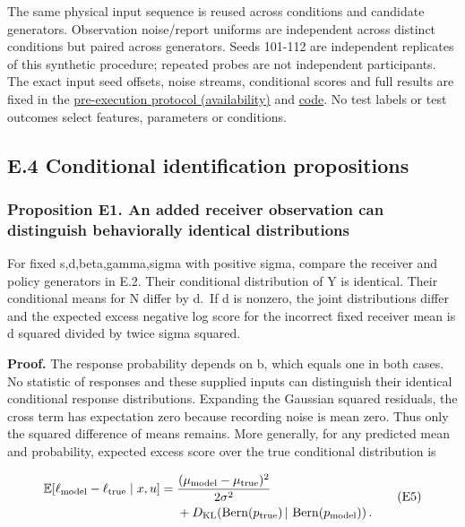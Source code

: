 \documentclass[
  american,
  11pt,
  letterpaper,
]{article}
\begin{document}
The same physical input sequence is reused across conditions and candidate generators. Observation noise/report uniforms are independent across distinct conditions but paired across generators. Seeds 101-112 are independent replicates of this synthetic procedure; repeated probes are not independent participants. The exact input seed offsets, noise streams, conditional scores and full results are fixed in the \href{https://github.com/v5ma/v5ma.github.io/blob/master/papers/companions/learning-to-feel-v1.0/ARTIFACT-AVAILABILITY.md\#artifact-9}{pre-execution protocol (availability)} and \href{https://github.com/v5ma/v5ma.github.io/blob/master/papers/companions/learning-to-feel-v1.0/analysis/joint-receiver-comparison.mjs}{code}. No test labels or test outcomes select features, parameters or conditions.

\subsection{E.4 Conditional identification propositions}\label{e.4-conditional-identification-propositions}

\subsubsection{Proposition E1. An added receiver observation can distinguish behaviorally identical distributions}\label{proposition-e1.-an-added-receiver-observation-can-distinguish-behaviorally-identical-distributions}

For fixed s,d,beta,gamma,sigma with positive sigma, compare the receiver and policy generators in E.2. Their conditional distribution of Y is identical. Their conditional means for N differ by d.~If d is nonzero, the joint distributions differ and the expected excess negative log score for the incorrect fixed receiver mean is d squared divided by twice sigma squared.

\textbf{Proof.} The response probability depends on b, which equals one in both cases. No statistic of responses and these supplied inputs can distinguish their identical conditional response distributions. Expanding the Gaussian squared residuals, the cross term has expectation zero because recording noise is mean zero. Thus only the squared difference of means remains. More generally, for any predicted mean and probability, expected excess score over the true conditional distribution is

\[
\begin{aligned}
\mathbb E[\ell_{\rm model}-\ell_{\rm true}\mid x,u]
 ={}&\frac{(\mu_{\rm model}-\mu_{\rm true})^2}{2\sigma^2}\\
 &+D_{\rm KL}\!\left(\operatorname{Bern}(p_{\rm true})\,|\,
                         \operatorname{Bern}(p_{\rm model})\right).
\end{aligned}\tag{E5}
\]
\end{document}
